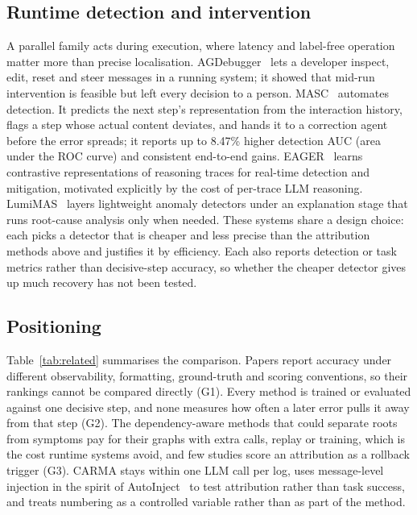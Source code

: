 \documentclass[conference]{IEEEtran}
\begin{document}
\subsection{Runtime detection and intervention}
A parallel family acts during execution, where latency and label-free operation matter more than precise localisation. AGDebugger~\cite{epperson2025interactive} lets a developer inspect, edit, reset and steer messages in a running system; it showed that mid-run intervention is feasible but left every decision to a person. MASC~\cite{shen2026masc} automates detection. It predicts the next step's representation from the interaction history, flags a step whose actual content deviates, and hands it to a correction agent before the error spreads; it reports up to 8.47\% higher detection AUC (area under the ROC curve) and consistent end-to-end gains. EAGER~\cite{zhang2026eager} learns contrastive representations of reasoning traces for real-time detection and mitigation, motivated explicitly by the cost of per-trace LLM reasoning. LumiMAS~\cite{solomon2026lumimas} layers lightweight anomaly detectors under an explanation stage that runs root-cause analysis only when needed. These systems share a design choice: each picks a detector that is cheaper and less precise than the attribution methods above and justifies it by efficiency. Each also reports detection or task metrics rather than decisive-step accuracy, so whether the cheaper detector gives up much recovery has not been tested.

\subsection{Positioning}
Table~\ref{tab:related} summarises the comparison. Papers report accuracy under different observability, formatting, ground-truth and scoring conventions, so their rankings cannot be compared directly (G1). Every method is trained or evaluated against one decisive step, and none measures how often a later error pulls it away from that step (G2). The dependency-aware methods that could separate roots from symptoms pay for their graphs with extra calls, replay or training, which is the cost runtime systems avoid, and few studies score an attribution as a rollback trigger (G3). CARMA stays within one LLM call per log, uses message-level injection in the spirit of AutoInject~\cite{huang2025resilience} to test attribution rather than task success, and treats numbering as a controlled variable rather than as part of the method.
\end{document}
